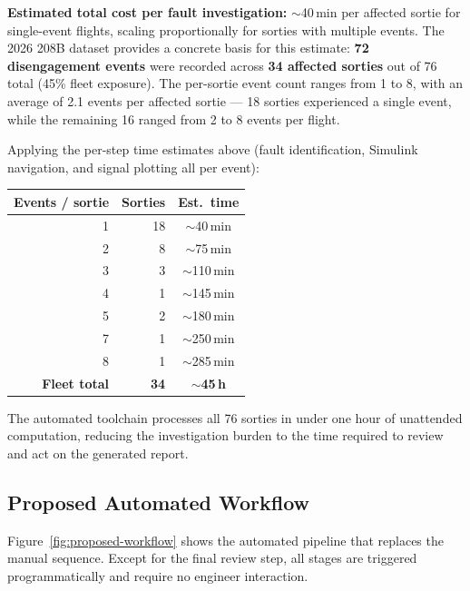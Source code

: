 \documentclass[11pt, letterpaper]{article}
\begin{document}
\medskip
\noindent\textbf{Estimated total cost per fault investigation:} $\sim$40\,min
per affected sortie for single-event flights, scaling proportionally for
sorties with multiple events. The 2026 208B dataset provides a concrete
basis for this estimate: \textbf{72 disengagement events} were recorded
across \textbf{34 affected sorties} out of 76 total (45\% fleet exposure).
The per-sortie event count ranges from 1 to 8, with an average of 2.1 events
per affected sortie --- 18 sorties experienced a single event, while the
remaining 16 ranged from 2 to 8 events per flight.

Applying the per-step time estimates above (fault identification, Simulink
navigation, and signal plotting all per event):

\medskip
\begin{center}
\begin{tabular}{@{} r r r r @{}}
\toprule
\textbf{Events / sortie} & \textbf{Sorties} & \multicolumn{2}{c}{\textbf{Est.\ time}} \\
\midrule
1 & 18 & \multicolumn{2}{c}{$\sim$40\,min} \\
2 &  8 & \multicolumn{2}{c}{$\sim$75\,min} \\
3 &  3 & \multicolumn{2}{c}{$\sim$110\,min} \\
4 &  1 & \multicolumn{2}{c}{$\sim$145\,min} \\
5 &  2 & \multicolumn{2}{c}{$\sim$180\,min} \\
7 &  1 & \multicolumn{2}{c}{$\sim$250\,min} \\
8 &  1 & \multicolumn{2}{c}{$\sim$285\,min} \\
\midrule
\textbf{Fleet total} & \textbf{34} & \multicolumn{2}{c}{\textbf{$\sim$45\,h}} \\
\bottomrule
\end{tabular}
\end{center}

\medskip
\noindent The automated toolchain processes all 76 sorties in under one hour
of unattended computation, reducing the investigation burden to the time
required to review and act on the generated report.

\subsection*{Proposed Automated Workflow}

Figure~\ref{fig:proposed-workflow} shows the automated pipeline that replaces
the manual sequence. Except for the final review step, all stages are
triggered programmatically and require no engineer interaction.
\end{document}
